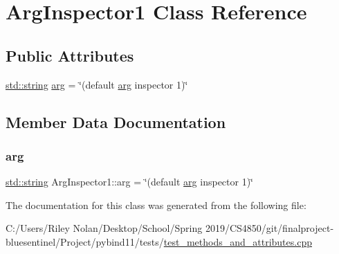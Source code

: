 \hypertarget{class_arg_inspector1}{}\section{Arg\+Inspector1 Class Reference}
\label{class_arg_inspector1}
\subsection*{Public Attributes}
\begin{DoxyCompactItemize}
\item 
\mbox{\hyperlink{_s_d_l__opengl__glext_8h_ab4ccfaa8ab0e1afaae94dc96ef52dde1}{std\+::string}} \mbox{\hyperlink{class_arg_inspector1_a8bbc3dfa94cba95e8d1962db79fbc7cb}{arg}} = \char`\"{}(default \mbox{\hyperlink{structarg}{arg}} inspector 1)\char`\"{}
\end{DoxyCompactItemize}


\subsection{Member Data Documentation}
\mbox{\label{class_arg_inspector1_a8bbc3dfa94cba95e8d1962db79fbc7cb}} 
\subsubsection{\texorpdfstring{arg}{arg}}
{\footnotesize\ttfamily \mbox{\hyperlink{_s_d_l__opengl__glext_8h_ab4ccfaa8ab0e1afaae94dc96ef52dde1}{std\+::string}} Arg\+Inspector1\+::arg = \char`\"{}(default \mbox{\hyperlink{structarg}{arg}} inspector 1)\char`\"{}}



The documentation for this class was generated from the following file\+:\begin{DoxyCompactItemize}
\item 
C\+:/\+Users/\+Riley Nolan/\+Desktop/\+School/\+Spring 2019/\+C\+S4850/git/finalproject-\/bluesentinel/\+Project/pybind11/tests/\mbox{\hyperlink{test__methods__and__attributes_8cpp}{test\+\_\+methods\+\_\+and\+\_\+attributes.\+cpp}}\end{DoxyCompactItemize}
